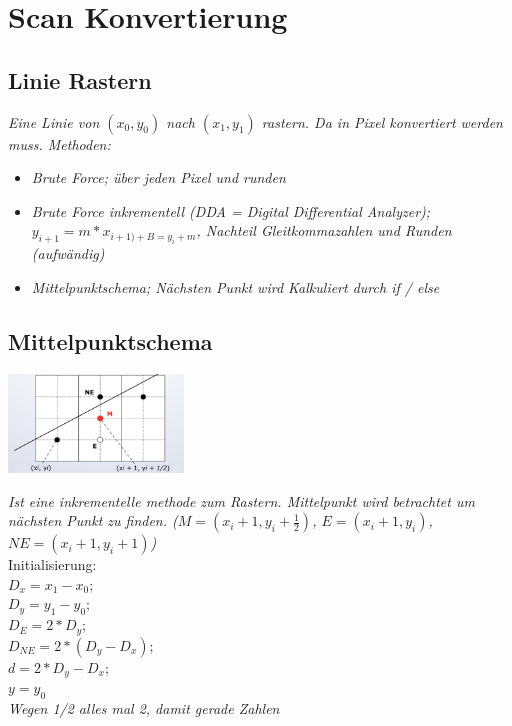 \section{Scan Konvertierung}

\subsection{Linie Rastern}

\textit{Eine Linie von $(x_0, y_0)$ nach $(x_1, y_1)$ rastern. Da in Pixel konvertiert werden muss. Methoden:}

\begin{itemize}
    \item \textit{Brute Force; über jeden Pixel und runden}
    \item \textit{Brute Force inkrementell (DDA = Digital Differential Analyzer); $y_{i+1} = m * x_{i+1) + B = y_i + m}$,
          Nachteil Gleitkommazahlen und Runden (aufwändig)}
    \item \textit{Mittelpunktschema; Nächsten Punkt wird Kalkuliert durch if / else}
\end{itemize}

\subsection{Mittelpunktschema}
\includegraphics[width=0.35\textwidth]{assets/Mittelpunktschema.png}

\textit{Ist eine inkrementelle methode zum Rastern. Mittelpunkt
wird betrachtet um nächsten Punkt zu finden. ($M = (x_i+1, y_i+\frac{1}{2})$, $E = (x_i+1, y_i)$, $NE = (x_i+1, y_i+1)$)}\\

Initialisierung:\\
$D_x = x_1 - x_0$; \\
$D_y = y_1 - y_0$; \\
$D_E = 2 * D_y$; \\
$D_{NE} = 2 * (D_y - D_x)$; \\
$d = 2*D_y - D_x$; \\
$y = y_0$ \\

\textit{Wegen 1/2 alles mal 2, damit gerade Zahlen}

